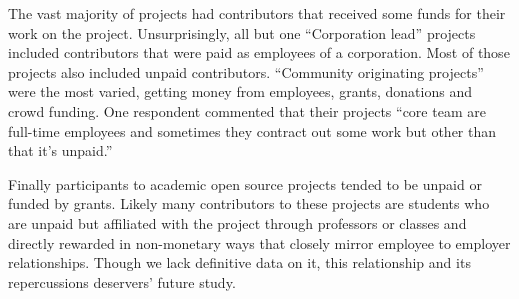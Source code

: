 The vast majority of projects had contributors that received some funds for their work on the project. Unsurprisingly, all but one “Corporation lead” projects included contributors that were paid as employees of a corporation. Most of those projects also included unpaid contributors. “Community  originating projects” were the most varied, getting money from employees, grants, donations and crowd funding. One respondent commented that their projects “core team are full-time employees and sometimes they contract out some work but other than that it's unpaid.”

Finally participants to academic open source projects tended to be unpaid or funded by grants. Likely many contributors to these projects are students who are unpaid but affiliated with the project through professors or classes and directly rewarded in non-monetary ways that closely mirror employee to employer relationships. Though we lack definitive data on it, this relationship and its repercussions deservers’ future study.
